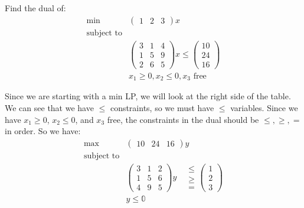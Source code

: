 \documentclass[a4paper]{report}
\newcommand\m[1]{\begin{pmatrix}#1\end{pmatrix}}
\begin{document}
\begin{eg}\label{eg}
Find the dual of: \\
\begin{equation*}
  \begin{aligned}
    \min & \m{1 & 2 & 3}x \\
    \text{subject to} & \\
                      & \m{3 & 1 & 4
                          \\ 1 & 5 & 9
                          \\ 2 & 6 & 5}x \leq \m{10 \\ 24 \\ 16} \\
                      & x_1 \geq 0, x_2 \leq 0, x_3 \text{ free}
  \end{aligned}
\end{equation*}
\begin{answer}
  Since we are starting with a min LP, we will look at the right side of the table. We can see that we have $\leq$ constraints, so we must have $\leq$ variables. Since we have $x_1 \geq 0$, $x_2 \leq 0$, and $x_3$ free, the constraints in the dual should be $\leq, \geq, =$ in  order. So we have:
  \begin{equation*}
  \begin{aligned}
    \max & \m{10 & 24 & 16}y \\
    \text{subject to} & \\
                      & \m{3 & 1 & 2
                          \\ 1 & 5 & 6
                        \\ 4 & 9 & 5}y 
                        \quad 
                        \begin{matrix} \leq \\ \geq \\ = \end{matrix} 
                        \m{1 \\ 2 \\ 3} \\
                      & y \leq \mathbb 0
  \end{aligned}
\end{equation*}
                        \end{answer}
\end{eg}
\end{document}
